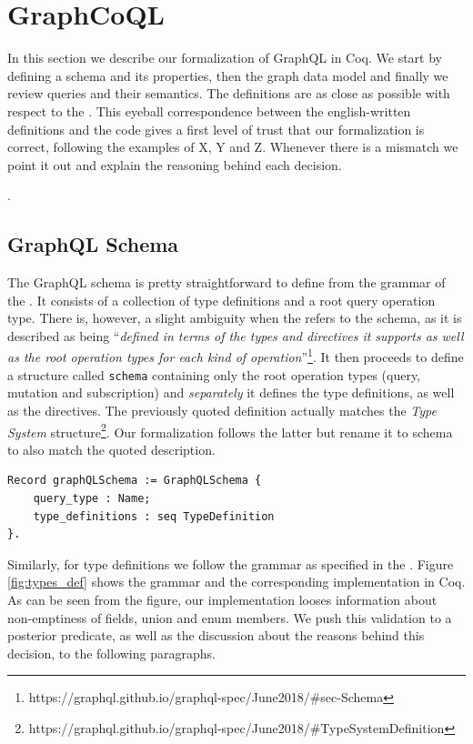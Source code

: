 
\section{GraphCoQL}\label{sec:form}

In this section we describe our formalization of GraphQL in Coq. We start by defining a schema and its properties, then the graph data model and finally we review queries and their semantics. The definitions are as close as possible with respect to the \spec{}. This eyeball correspondence between the english-written definitions and the code gives a first level of trust that our formalization is correct, following the examples of X, Y and Z. Whenever there is a mismatch we point it out and explain the reasoning behind each decision.


.

\subsection{GraphQL Schema}

The GraphQL schema is pretty straightforward to define from the grammar of the \spec{}. It consists of a collection of type definitions and a root query operation type. There is, however, a slight ambiguity when the \spec{} refers to the schema, as it is described as being ``\textit{defined in terms of the types and directives it supports as well as the root operation types for each kind of operation}''\footnote{https://graphql.github.io/graphql-spec/June2018/\#sec-Schema}. It then proceeds to define a structure called \texttt{schema} containing only the root operation types (query, mutation and subscription) and \textit{separately} it defines the type definitions, as well as the directives. The previously quoted definition actually matches the \textit{Type System} structure\footnote{https://graphql.github.io/graphql-spec/June2018/\#TypeSystemDefinition}. Our formalization follows the latter but rename it to schema to also match the quoted description.

\begin{verbatim}
Record graphQLSchema := GraphQLSchema {
    query_type : Name;
    type_definitions : seq TypeDefinition
}.
\end{verbatim}

Similarly, for type definitions we follow the grammar as specified in the \spec{}. Figure \ref{fig:types_def} shows the grammar and the corresponding implementation in Coq. As can be seen from the figure, our implementation looses information about non-emptiness of fields, union and enum members. We push this validation to a posterior predicate, as well as the discussion about the reasons behind this decision, to the following paragraphs.

